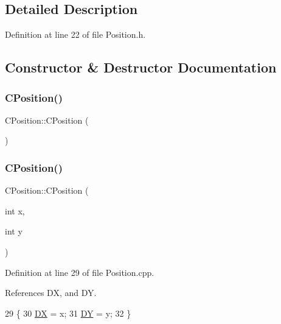 \subsection{Detailed Description}


Definition at line 22 of file Position.\+h.



\subsection{Constructor \& Destructor Documentation}
\hypertarget{classCPosition_a0286273b62fb1419e0e358eb4c352458}{}\label{classCPosition_a0286273b62fb1419e0e358eb4c352458} 
\subsubsection{\texorpdfstring{C\+Position()}{CPosition()}\hspace{0.1cm}{\footnotesize\ttfamily [1/3]}}
{\footnotesize\ttfamily C\+Position\+::\+C\+Position (\begin{DoxyParamCaption}{ }\end{DoxyParamCaption})\hspace{0.3cm}{\ttfamily [default]}}

\hypertarget{classCPosition_a646b8a1a7c27e14a08becef2f61461df}{}\label{classCPosition_a646b8a1a7c27e14a08becef2f61461df} 
\subsubsection{\texorpdfstring{C\+Position()}{CPosition()}\hspace{0.1cm}{\footnotesize\ttfamily [2/3]}}
{\footnotesize\ttfamily C\+Position\+::\+C\+Position (\begin{DoxyParamCaption}\item[{int}]{x,  }\item[{int}]{y }\end{DoxyParamCaption})}



Definition at line 29 of file Position.\+cpp.



References DX, and DY.


\begin{DoxyCode}
29                                 \{
30     \hyperlink{classCPosition_a28445f9b872169715919074d82044eda}{DX} = x;
31     \hyperlink{classCPosition_a84139c9e8eb547e7cf3cb851739943a4}{DY} = y;
32 \}
\end{DoxyCode}
\hypertarget{classCPosition_afb5f1cfc928945c49d3ce88c4ab19396}{}\label{classCPosition_afb5f1cfc928945c49d3ce88c4ab19396} 
